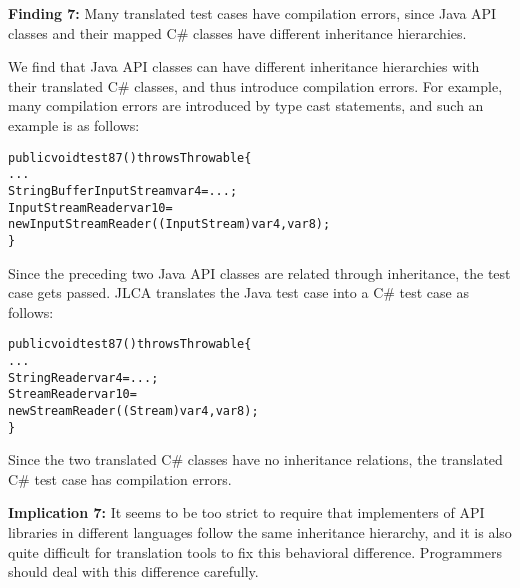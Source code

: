 \textbf{Finding 7:} Many translated test cases have compilation errors, since Java API classes and their mapped C\# classes have different inheritance hierarchies.

We find that Java API classes can have different inheritance hierarchies with their translated C\# classes, and thus introduce compilation errors. For example, many compilation errors are introduced by type cast statements, and such an example is as follows:

\begin{CodeOut}\vspace*{-1ex}
\begin{alltt}
public void test87() throws Throwable\{
  ...
  StringBufferInputStream var4=...;
  InputStreamReader var10=
    new InputStreamReader((InputStream)var4, var8);
\}
\end{alltt}
\end{CodeOut}\vspace*{-2ex}

Since the preceding two Java API classes are related through inheritance, the test case gets passed. JLCA translates the Java test case into a C\# test case as follows:

\begin{CodeOut}\vspace*{-1ex}
\begin{alltt}
public void test87() throws Throwable\{
  ...
  StringReader var4=...;
  StreamReader var10=
    new StreamReader((Stream)var4, var8);
\}
\end{alltt}
\end{CodeOut}\vspace*{-2ex}

Since the two translated C\# classes have no inheritance relations, the translated C\# test case has compilation errors.

\textbf{Implication 7:} It seems to be too strict to require that implementers of API libraries in different languages follow the same inheritance hierarchy, and it is also quite difficult for translation tools to fix this behavioral difference. Programmers should deal with this difference carefully.



